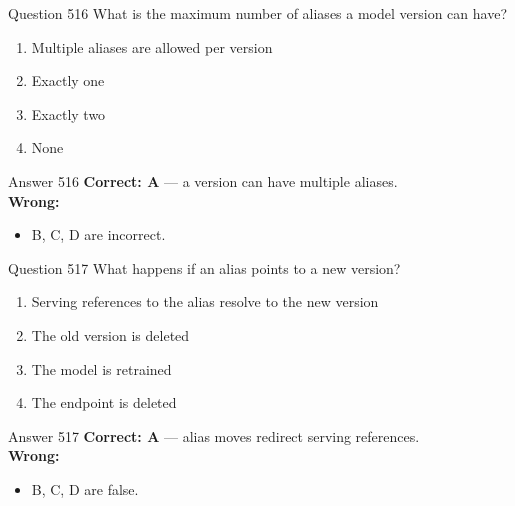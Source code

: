 \documentclass[aspectratio=169,11pt]{beamer}
\begin{document}
	\begin{frame}{Question 516}
		What is the maximum number of aliases a model version can have?
		\begin{enumerate}[label=\Alph*.]
			\item Multiple aliases are allowed per version
			\item Exactly one
			\item Exactly two
			\item None
		\end{enumerate}
	\end{frame}
	\begin{frame}{Answer 516}
		\textbf{Correct: A} --- a version can have multiple aliases.\\
		\vspace{0.5em}
		\textbf{Wrong:}
		\begin{itemize}
			\item B, C, D are incorrect.
		\end{itemize}
	\end{frame}
	
	\begin{frame}{Question 517}
		What happens if an alias points to a new version?
		\begin{enumerate}[label=\Alph*.]
			\item Serving references to the alias resolve to the new version
			\item The old version is deleted
			\item The model is retrained
			\item The endpoint is deleted
		\end{enumerate}
	\end{frame}
	\begin{frame}{Answer 517}
		\textbf{Correct: A} --- alias moves redirect serving references.\\
		\vspace{0.5em}
		\textbf{Wrong:}
		\begin{itemize}
			\item B, C, D are false.
		\end{itemize}
	\end{frame}
	
\end{document}
